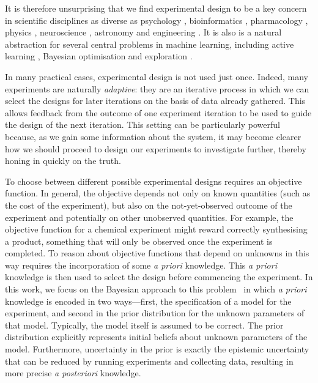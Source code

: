 \documentclass[a4paper, 10pt]{report}
\theoremstyle{plain}
\begin{document}
	It is therefore unsurprising that we find experimental design to be a key concern in scientific disciplines as diverse as psychology \citep{myung2013}, bioinformatics \citep{vanlier2012}, pharmacology \citep{lyu2019ultra}, physics \citep{dushenko2020sequential}, neuroscience \citep{shababo2013bayesian}, astronomy \citep{loredo2004bayesian} and engineering \citep{papadimitriou2004optimal}.
	It is also is a natural abstraction for several central problems in machine learning, including active learning \citep{houlsby2011bayesian,gal2017deep}, Bayesian optimisation \citep{hernandez2014,shahriari2015taking} and exploration \citep{sun2011planning,shyam2019model}.
	
	
	In many practical cases, experimental design is not used just once.
	Indeed, many experiments are naturally \emph{adaptive}: they are an iterative process in which we can select the designs for later iterations on the basis of data already gathered. 
	This allows feedback from the outcome of one experiment iteration to be used to guide the design of the next iteration.
	This setting can be particularly powerful because, as we gain some information about the system, it may become clearer how we should proceed to design our experiments to investigate further, thereby honing in quickly on the truth.
	
	To choose between different possible experimental designs requires an objective function.
	In general, the objective depends not only on known quantities (such as the cost of the experiment), but also on the not-yet-observed outcome of the experiment and potentially on other unobserved quantities. %
	For example, the objective function for a chemical experiment might reward correctly synthesising a product, something that will only be observed once the experiment is completed.
	To reason about objective functions that depend on unknowns in this way requires the incorporation of some \emph{a priori} knowledge. This \emph{a priori} knowledge is then used to select the design before commencing the experiment.
	In this work, we focus on the Bayesian approach to this problem~\citep{lindley1956,lindley1972,chaloner1995,ryan2016review,foster2019variational} in which \emph{a priori} knowledge is encoded in two ways---first, the specification of a model for the experiment, and second in the prior distribution for the unknown parameters of that model.
	Typically, the model itself is assumed to be correct.
	The prior distribution explicitly represents initial beliefs about unknown parameters of the model.
	Furthermore, uncertainty in the prior is exactly the epistemic uncertainty that can be reduced by running experiments and collecting data, resulting in more precise \emph{a posteriori} knowledge.
	
\end{document}
